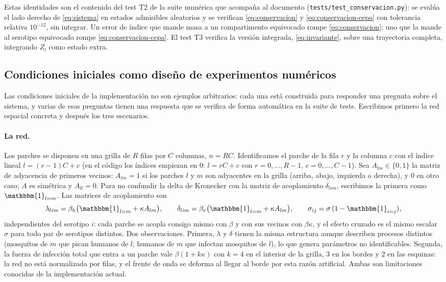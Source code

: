 \documentclass{article}
\numberwithin{equation}{section}
\begin{document}
Estas identidades son el contenido del test T2 de la suite numérica que acompaña al documento (\texttt{tests/test\_conservacion.py}): se evalúa el lado derecho de \eqref{eq:sistema} en estados admisibles aleatorios y se verifican \eqref{eq:conservacion} y \eqref{eq:conservacion-cepa} con tolerancia relativa $10^{-12}$, sin integrar. Un error de índice que mande masa a un compartimento equivocado rompe \eqref{eq:conservacion}; uno que la mande al serotipo equivocado rompe \eqref{eq:conservacion-cepa}. El test T3 verifica la versión integrada, \eqref{eq:invariante}, sobre una trayectoria completa, integrando $Z_l$ como estado extra.

\subsection{Condiciones iniciales como diseño de experimentos numéricos}\label{sec:experimentos}

Las condiciones iniciales de la implementación no son ejemplos arbitrarios: cada una está construida para responder una pregunta sobre el sistema, y varias de esas preguntas tienen una respuesta que se verifica de forma automática en la suite de tests. Escribimos primero la red espacial concreta y después los tres escenarios.

\paragraph{La red.} Los parches se disponen en una grilla de $R$ filas por $C$ columnas, $n=RC$. Identificamos el parche de la fila $r$ y la columna $c$ con el índice lineal $l=(r-1)C+c$ (en el código los índices empiezan en $0$: $l=rC+c$ con $r=0,\dots,R-1$, $c=0,\dots,C-1$). Sea $A_{lm}\in\{0,1\}$ la matriz de adyacencia de primeros vecinos: $A_{lm}=1$ si los parches $l$ y $m$ son adyacentes en la grilla (arriba, abajo, izquierda o derecha), y $0$ en otro caso; $A$ es simétrica y $A_{ll}=0$. Para no confundir la delta de Kronecker con la matriz de acoplamiento $\delta_{lim}$, escribimos la primera como $\mathbbm{1}_{l=m}$. Las matrices de acoplamiento son
\begin{equation}\label{eq:red}
\lambda_{lim}=\beta_h\big(\mathbbm{1}_{l=m}+\kappa A_{lm}\big),\qquad
\delta_{lim}=\beta_v\big(\mathbbm{1}_{l=m}+\kappa A_{lm}\big),\qquad
\sigma_{ij}=\sigma\,(1-\mathbbm{1}_{i=j}),
\end{equation}
independientes del serotipo $i$: cada parche se acopla consigo mismo con $\beta$ y con sus vecinos con $\beta\kappa$, y el efecto cruzado es el mismo escalar $\sigma$ para todo par de serotipos distintos. Dos observaciones. Primera, $\lambda$ y $\delta$ tienen la misma estructura aunque describen procesos distintos (mosquitos de $m$ que pican humanos de $l$; humanos de $m$ que infectan mosquitos de $l$), lo que genera parámetros no identificables. Segunda, la fuerza de infección total que entra a un parche vale $\beta(1+k\kappa)$ con $k=4$ en el interior de la grilla, $3$ en los bordes y $2$ en las esquinas: la red no está normalizada por filas, y el frente de onda se deforma al llegar al borde por esta razón artificial. Ambas son limitaciones conocidas de la implementación actual.
\end{document}
